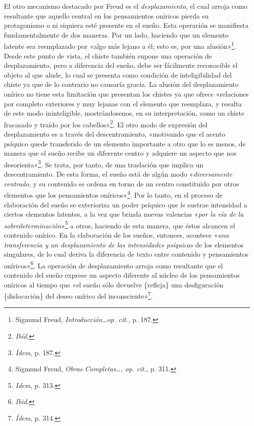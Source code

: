 El otro mecanismo destacado por Freud es el \emph{desplazamiento}, el cual arroja como resultante que aquello central en los pensamientos oníricos pierda su protagonismo o ni siquiera esté presente en el sueño. Esta operación se manifiesta fundamentalmente de dos maneras. Por un lado, haciendo que un elemento latente sea reemplazado por «algo más lejano a él; esto es, por una alusión»\footnote{Sigmund Freud, \emph{Introducción\ldots op. cit.,} p. 187.}. Desde este punto de vista, el chiste también supone una operación de desplazamiento, pero a diferencia del sueño, debe ser fácilmente reconocible el objeto al que alude, lo cual se presenta como condición de inteligibilidad del chiste ya que de lo contrario no causaría gracia. La alusión del desplazamiento onírico no tiene esta limitación que presentan los chistes ya que ofrece «relaciones por completo exteriores y muy lejanas con el elemento que reemplaza, y resulta de este modo ininteligible, mostrándosenos, en su interpretación, como un chiste fracasado y traído por los cabellos»\footnote{\emph{Ibíd}.}. El otro modo de expresión del desplazamiento es a través del descentramiento, «motivando que el acento psíquico quede transferido de un elemento importante a otro que lo es menos, de manera que el sueño recibe un diferente centro y adquiere un aspecto que nos desorienta»\footnote{\emph{Ídem}, p. 187.}. Se trata, por tanto, de una traslación que implica un descentramiento. De esta forma, el sueño está de algún modo «\emph{diversamente centrado}, y su contenido se ordena en torno de un centro constituido por otros elementos que los pensamientos oníricos»\footnote{Sigmund Freud, \emph{Obras Completas\ldots, op. cit.}, p. 311.}. Por lo tanto, en el proceso de elaboración del sueño se exterioriza un poder psíquico que le sustrae intensidad a ciertos elementos latentes, a la vez que brinda nuevas valencias «\emph{por la vía de la sobredeterminación}»\footnote{\emph{Idem}, p. 313.} a otros, haciendo de esta manera, que éstos alcancen el contenido onírico. En la elaboración de los sueños, entonces, acontece «\emph{una transferencia y un desplazamiento de las intensidades psíquicas} de los elementos singulares, de lo cual deriva la diferencia de texto entre contenido y pensamientos oníricos»\footnote{\emph{Ibid}.}. La operación de desplazamiento arroja como resultante que el contenido del sueño exprese un aspecto diferente al núcleo de los pensamientos oníricos al tiempo que «el sueño sólo devuelve \{refleja\} una desfiguración \{dislocación\} del deseo onírico del inconsciente»\footnote{\emph{Ídem}, p. 314.}.

